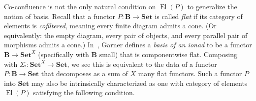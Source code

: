 \documentclass[11pt, oneside, article]{memoir}
\theoremstyle{plain}
\theoremstyle{definition}
\theoremstyle{remark}
\DeclareMathOperator{\Aut}{Aut}
\DeclareMathOperator{\El}{El}
\DeclareMathOperator{\ophelper}{op}
\DeclareMathOperator\groth{\int\!}
\DeclarePairedDelimiter{\gen}{\langle}{\rangle}
\newcommand{\dash}{{\mathord{\text{--}}}}
\newcommand{\op}{^{\ophelper}}
\newcommand{\xto}[1]{\xrightarrow{#1}}
\newcommand{\bang}{\mathrm{!}}
\newcommand{\namedcat}[1]{\mathbf{#1}}
\newcommand{\cat}[1]{\mathbf{#1}}
\newcommand{\Set}{\namedcat{Set}}
\newcommand{\Cat}{\namedcat{Cat}}
\newcommand{\slicel}{\Sigma_\bang}
\newcommand{\ph}[1]{#1}
\newcommand{\xA}{A}
\newcommand{\xX}{X}
\newcommand{\bB}{\cat{B}}
\newcommand{\bC}{\cat{C}}
\newcommand{\bG}{\cat{G}}
\newcommand{\bJ}{\cat{J}}
\newcommand{\pP}{\ph{P}}
\newcommand{\cP}{\gen{\pP}}
\newcommand{\cattocmd}[1]{{{#1}^\bullet}}
\newcommand{\cattocmdp}[1]{{{#1}^\circ}}
\begin{document}


Co-confluence is not the only natural condition on $\El(\pP)$ to
generalize the notion of basis. Recall that a functor
$\pP\colon \bB \to \Set$ is called \emph{flat} if its category of
elements is \emph{cofiltered}, meaning every finite diagram admits a
cone. (Or equivalently: the empty diagram, every pair of objects, and
every parallel pair of morphisms admits a cone.)
In~\cite{garner:ionads}, Garner defines a \emph{basis of an ionad} to
be a functor $\bB \to \Set^\xX$ (specifically with $\bB$ small) that
is componentwise flat. Composing with
$\slicel \colon \Set^\xX \to \Set$, we see this is equivalent to the
data of a functor $\pP \colon \bB \to \Set$ that decomposes as a sum
of $\xX$ many flat functors. Such a functor $\pP$ into $\Set$ may also
be intrinsically characterized as one with category of elements
$\El(\pP)$ satisfying the following condition.
\end{document}
